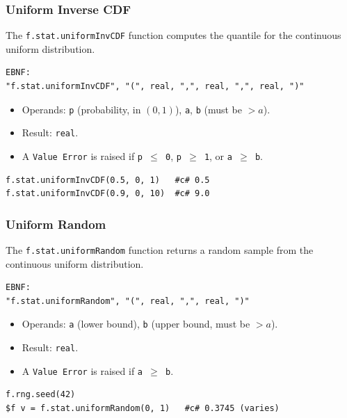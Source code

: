 \subsubsection{Uniform Inverse CDF}
The \texttt{f.stat.uniformInvCDF} function computes the quantile for the continuous uniform distribution.
\begin{verbatim}
EBNF:
"f.stat.uniformInvCDF", "(", real, ",", real, ",", real, ")"
\end{verbatim}
\begin{itemize}
\item Operands: \texttt{p} (probability, in $(0, 1)$), \texttt{a}, \texttt{b} (must be $> a$).
\item Result: \texttt{real}.
\item A \texttt{Value Error} is raised if \texttt{p $\leq$ 0}, \texttt{p $\geq$ 1}, or \texttt{a $\geq$ b}.
\end{itemize}
\begin{verbatim}
f.stat.uniformInvCDF(0.5, 0, 1)   #c# 0.5
f.stat.uniformInvCDF(0.9, 0, 10)  #c# 9.0
\end{verbatim}

\subsubsection{Uniform Random}
The \texttt{f.stat.uniformRandom} function returns a random sample from the continuous uniform distribution.
\begin{verbatim}
EBNF:
"f.stat.uniformRandom", "(", real, ",", real, ")"
\end{verbatim}
\begin{itemize}
\item Operands: \texttt{a} (lower bound), \texttt{b} (upper bound, must be $> a$).
\item Result: \texttt{real}.
\item A \texttt{Value Error} is raised if \texttt{a $\geq$ b}.
\end{itemize}
\begin{verbatim}
f.rng.seed(42)
$f v = f.stat.uniformRandom(0, 1)   #c# 0.3745 (varies)
\end{verbatim}

